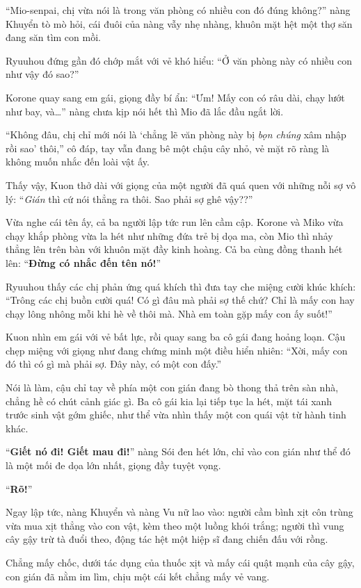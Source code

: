 \documentclass[../main.tex]{subfiles}
\begin{document}
``Mio-senpai, chị vừa nói là trong văn phòng có nhiều con đó đúng không?'' nàng Khuyển tò mò hỏi, cái đuôi của nàng vẫy nhẹ nhàng, khuôn mặt hệt một thợ săn đang săn tìm con mồi.

Ryuuhou đứng gần đó chớp mắt với vẻ khó hiểu: ``Ở văn phòng này có nhiều con như vậy đó sao?''

Korone quay sang em gái, giọng đầy bí ẩn: ``Ưm! Mấy con có râu dài, chạy lướt như bay, và\dots'' nàng chưa kịp nói hết thì Mio đã lắc đầu ngắt lời.

``Không đâu, chị chỉ mới nói là `chẳng lẽ văn phòng này bị \emph{bọn chúng} xâm nhập rồi sao' thôi,'' cô đáp, tay vẫn đang bê một chậu cây nhỏ, vẻ mặt rõ ràng là không muốn nhắc đến loài vật ấy.

Thấy vậy, Kuon thở dài với giọng của một người đã quá quen với những nỗi sợ vô lý: ``\emph{Gián} thì cứ nói thẳng ra thôi. Sao phải sợ ghê vậy??''

Vừa nghe cái tên ấy, cả ba người lập tức run lên cầm cập. Korone và Miko vừa chạy khắp phòng vừa la hét như những đứa trẻ bị dọa ma, còn Mio thì nhảy thẳng lên trên bàn với khuôn mặt đầy kinh hoàng. Cả ba cùng đồng thanh hét lên: ``\textbf{Đừng có nhắc đến tên nó!}''

Ryuuhou thấy các chị phản ứng quá khích thì đưa tay che miệng cười khúc khích: ``Trông các chị buồn cười quá! Có gì đâu mà phải sợ thế chứ? Chỉ là mấy con hay chạy lông nhông mỗi khi hè về thôi mà. Nhà em toàn gặp mấy con ấy suốt!''

Kuon nhìn em gái với vẻ bất lực, rồi quay sang ba cô gái đang hoảng loạn. Cậu chẹp miệng với giọng như đang chứng minh một điều hiển nhiên: ``Xời, mấy con đó thì có gì mà phải sợ. Đây này, có một con đấy.''

Nói là làm, cậu chỉ tay về phía một con gián đang bò thong thả trên sàn nhà, chẳng hề có chút cảnh giác gì. Ba cô gái kia lại tiếp tục la hét, mặt tái xanh trước sinh vật gớm ghiếc, như thể vừa nhìn thấy một con quái vật từ hành tinh khác.

``\textbf{Giết nó đi! Giết mau đi!}'' nàng Sói đen hét lớn, chỉ vào con gián như thể đó là một mối đe dọa lớn nhất, giọng đầy tuyệt vọng.

``\textbf{Rõ!}''

Ngay lập tức, nàng Khuyển và nàng Vu nữ lao vào: người cầm bình xịt côn trùng vừa mua xịt thẳng vào con vật, kèm theo một luồng khói trắng; người thì vung cây gậy trừ tà đuổi theo, động tác hệt một hiệp sĩ đang chiến đấu với rồng.

Chẳng mấy chốc, dưới tác dụng của thuốc xịt và mấy cái quật mạnh của cây gậy, con gián đã nằm im lìm, chịu một cái kết chẳng mấy vẻ vang.
\end{document}
